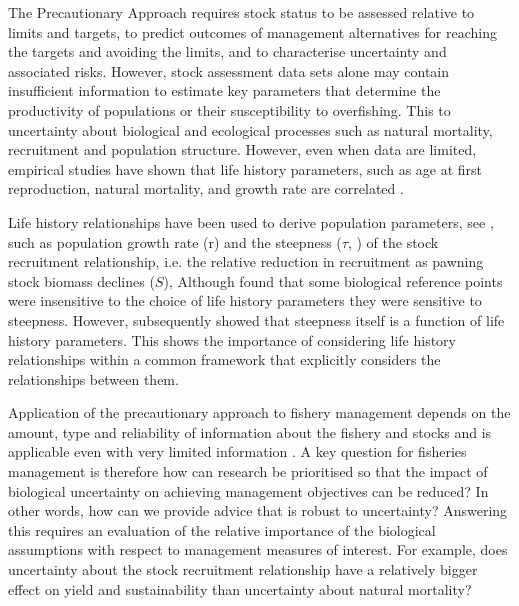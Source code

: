\documentclass[preprint,authoryear,12pt]{elsarticle}
\begin{document}
The Precautionary Approach requires stock status to be assessed 
relative to limits and targets, to predict outcomes of management alternatives for reaching the targets 
and avoiding the limits, and to characterise uncertainty and associated risks. 
However, stock assessment data sets alone may contain insufficient information to estimate key 
parameters that determine the productivity of populations or their susceptibility to overfishing. 
This to uncertainty about biological and ecological processes such as natural mortality, 
recruitment and population structure. However, even when data are limited, empirical studies have
shown that life history parameters, such as age at first reproduction, natural mortality, and 
growth rate are correlated \citep{roff1984evolution, andersen2006asymptotic, pope2006modelling, 
gislason2008coexistence}. 

Life history relationships have been used to derive population parameters, see \citep{mcallister2001using, simon2012effects}, 
such as population growth rate (r) and the steepness ($\tau$, \cite{francis1992use})
of the stock recruitment relationship, i.e. the relative reduction in recruitment as  pawning stock biomass declines ($S$), 
Although \cite{williams2003implications} found that some biological reference points were insensitive to the choice of 
life history  parameters they were  sensitive to steepness. However, subsequently \citep{mangel2010reproductive, simon2012effects} 
showed that steepness itself is a function of life history parameters. This shows the importance of considering life history 
relationships within a common framework that explicitly considers the relationships between them.

Application of the precautionary approach to fishery management depends on the amount, type and reliability of information 
about the fishery and stocks and is applicable even with very limited information \citep{garcia1996precautionary}. A key question 
for fisheries management is therefore how can research be prioritised
so that the impact of biological uncertainty on achieving management objectives
can be reduced? In other words, how can we provide advice that is robust to uncertainty?
Answering this requires an evaluation of the relative importance of the biological assumptions 
with respect to management measures of interest. 
For example, does uncertainty about the stock recruitment relationship have a relatively bigger effect on 
yield and sustainability than uncertainty about natural mortality? 
\end{document}
